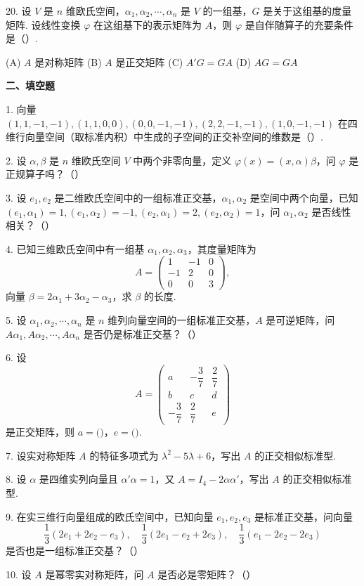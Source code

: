 \documentclass[UTF8,12pt,a4paper,fontset=fandol]{ctexart}
\begin{document}
20. 设 $V$ 是 $n$ 维欧氏空间，$\alpha_1,\alpha_2,\cdots,\alpha_n$ 是 $V$ 的一组基，$G$ 是关于这组基的度量矩阵. 设线性变换 $\varphi$ 在这组基下的表示矩阵为 $A$，则 $\varphi$ 是自伴随算子的充要条件是（\quad ）.

(A) $A$ 是对称矩阵 \qquad (B) $A$ 是正交矩阵 \qquad (C) $A'G=GA$ \qquad (D) $AG=GA$

\noindent\textbf{二、填空题}

1. 向量 $(1,1,-1,-1),(1,1,0,0),(0,0,-1,-1),(2,2,-1,-1),(1,0,-1,-1)$ 在四维行向量空间（取标准内积）中生成的子空间的正交补空间的维数是（\quad ）.

2. 设 $\alpha,\beta$ 是 $n$ 维欧氏空间 $V$ 中两个非零向量，定义 $\varphi(x)=(x,\alpha)\beta$，问 $\varphi$ 是正规算子吗？（\quad ）

3. 设 $e_1,e_2$ 是二维欧氏空间中的一组标准正交基，$\alpha_1,\alpha_2$ 是空间中两个向量，已知 $(e_1,\alpha_1)=1,(e_1,\alpha_2)=-1,(e_2,\alpha_1)=2,(e_2,\alpha_2)=1$，问 $\alpha_1,\alpha_2$ 是否线性相关？（\quad ）

4. 已知三维欧氏空间中有一组基 $\alpha_1,\alpha_2,\alpha_3$，其度量矩阵为
\[
A=\begin{pmatrix}
1&-1&0\\
-1&2&0\\
0&0&3
\end{pmatrix},
\]
向量 $\beta=2\alpha_1+3\alpha_2-\alpha_3$，求 $\beta$ 的长度.

5. 设 $\alpha_1,\alpha_2,\cdots,\alpha_n$ 是 $n$ 维列向量空间的一组标准正交基，$A$ 是可逆矩阵，问 $A\alpha_1,A\alpha_2,\cdots,A\alpha_n$ 是否仍是标准正交基？（\quad ）

6. 设
\[
A=\begin{pmatrix}
a&-\dfrac{3}{7}&\dfrac{2}{7}\\
b&c&d\\
-\dfrac{3}{7}&\dfrac{2}{7}&e
\end{pmatrix}
\]
是正交矩阵，则 $a=($\quad$)$，$e=($\quad$)$.

7. 设实对称矩阵 $A$ 的特征多项式为 $\lambda^2-5\lambda+6$，写出 $A$ 的正交相似标准型.

8. 设 $\alpha$ 是四维实列向量且 $\alpha'\alpha=1$，又 $A=I_4-2\alpha\alpha'$，写出 $A$ 的正交相似标准型.

9. 在实三维行向量组成的欧氏空间中，已知向量 $e_1,e_2,e_3$ 是标准正交基，问向量
\[
\frac{1}{3}(2e_1+2e_2-e_3),\quad \frac{1}{3}(2e_1-e_2+2e_3),\quad \frac{1}{3}(e_1-2e_2-2e_3)
\]
是否也是一组标准正交基？（\quad ）

10. 设 $A$ 是幂零实对称矩阵，问 $A$ 是否必是零矩阵？（\quad ）
\end{document}
